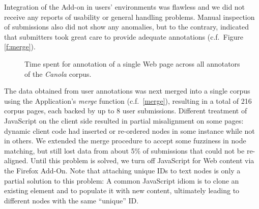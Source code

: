 Integration of the Add-on in users' environments was flawless and we did not receive any reports of usability or general handling problems.
Manual inspection of submissions also did not show any anomalies, but to the contrary, indicated that submitters took great care to provide adequate annotations (c.f.~Figure \ref{f:merge}).

\begin{figure}[h]
\centering
{}
\caption{
\label{f:userstats}
\label{ens1}
	Time spent for annotation of a single Web page across all annotators of the \textit{Canola} corpus.}
\end{figure}

The data obtained from user annotations was next merged into a single corpus using the Application's \textit{merge} function (c.f.~\ref{merge}), resulting in a total of 216 corpus pages, each backed by up to 8 user submissions.
Different treatment of JavaScript on the client side resulted in partial misalignment on some pages:
dynamic client code had inserted or re-ordered nodes in some instance while not in others.
We extended the merge procedure to accept some fuzziness in node matching, but still lost data from about 5\% of submissions that could not be re-aligned.
Until this problem is solved, we turn off JavaScript for Web content via the Firefox Add-On.
Note that attaching unique IDs to text nodes is only a partial solution to this problem:
A common JavaScript idiom is to clone an existing element and to populate it with new content, ultimately leading to different nodes with the same ``unique'' ID. 

